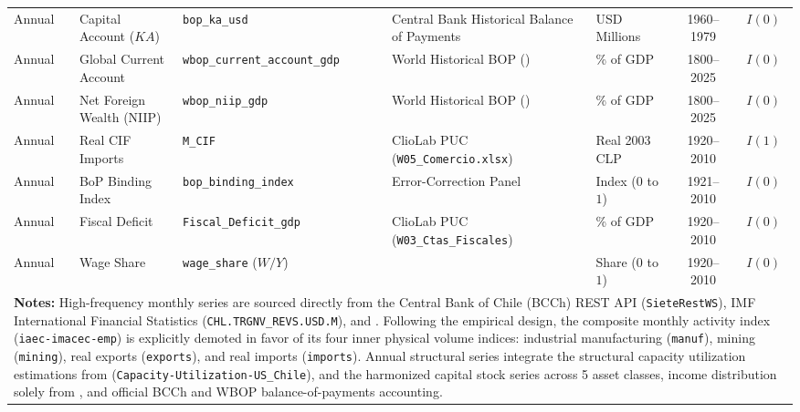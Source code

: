 \begin{table}[htbp]
{\begin{tabular}{lllllcc}
Annual & Capital Account ($KA$) & \texttt{bop\_ka\_usd} & Central Bank Historical Balance of Payments & USD Millions & 1960--1979 & $I(0)$ \\
Annual & Global Current Account & \texttt{wbop\_current\_account\_gdp} & World Historical BOP (\citealt{NievasPiketty2025}) & \% of GDP & 1800--2025 & $I(0)$ \\
Annual & Net Foreign Wealth (NIIP) & \texttt{wbop\_niip\_gdp} & World Historical BOP (\citealt{NievasPiketty2025}) & \% of GDP & 1800--2025 & $I(0)$ \\
Annual & Real CIF Imports & \texttt{M\_CIF} & ClioLab PUC (\texttt{W05\_Comercio.xlsx}) & Real 2003 CLP & 1920--2010 & $I(1)$ \\
Annual & BoP Binding Index & \texttt{bop\_binding\_index} & \citet{Polanco2026} Error-Correction Panel & Index ($0$ to $1$) & 1921--2010 & $I(0)$ \\
Annual & Fiscal Deficit & \texttt{Fiscal\_Deficit\_gdp} & ClioLab PUC (\texttt{W03\_Ctas\_Fiscales}) & \% of GDP & 1920--2010 & $I(0)$ \\
Annual & Wage Share & \texttt{wage\_share} ($W/Y$) & \citet{Astorga2023} & Share ($0$ to $1$) & 1920--2010 & $I(0)$ \\
\bottomrule
\multicolumn{7}{p{16.5cm}}{\footnotesize \textbf{Notes:} High-frequency monthly series are sourced directly from the Central Bank of Chile (BCCh) REST API (\texttt{SieteRestWS}), IMF International Financial Statistics (\texttt{CHL.TRGNV\_REVS.USD.M}), and \citet{DiazBahamonde2023}. Following the empirical design, the composite monthly activity index (\texttt{iaec-imacec-emp}) is explicitly demoted in favor of its four inner physical volume indices: industrial manufacturing (\texttt{manuf}), mining (\texttt{mining}), real exports (\texttt{exports}), and real imports (\texttt{imports}). Annual structural series integrate the structural capacity utilization estimations from \citet{Polanco2026} (\texttt{Capacity-Utilization-US\_Chile}), and the harmonized capital stock series across 5 asset classes, income distribution solely from \citet{Astorga2023}, and official BCCh and WBOP balance-of-payments accounting.} \\
\end{tabular}%
}
\end{table}
